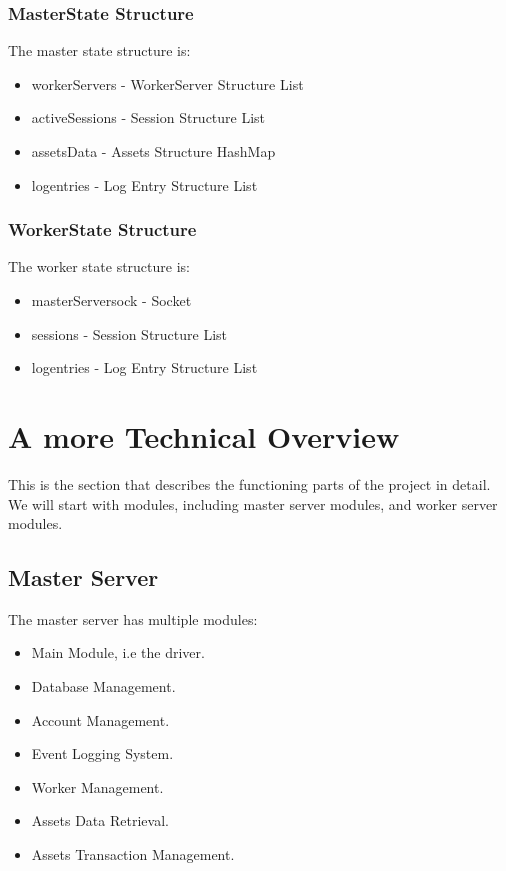 \documentclass[a4paper]{article}
\begin{document}
\subsubsection{MasterState Structure}
\label{ds_masterstate}
The master state structure is:
\begin{itemize}
	\item workerServers - WorkerServer Structure List
	\item activeSessions - Session Structure List
	\item assetsData - Assets Structure HashMap
	\item logentries - Log Entry Structure List
\end{itemize}

\subsubsection{WorkerState Structure}
\label{ds_workerstate}
The worker state structure is:
\begin{itemize}
	\item masterServersock - Socket
	\item sessions - Session Structure List
	\item logentries - Log Entry Structure List
\end{itemize}

\section{A more Technical Overview}
\label{technical_overview}
This is the section that describes the functioning parts of the project in
detail. We will start with modules, including master server modules, and worker
server modules.

\subsection{Master Server}
\label{technical_master_server}
The master server has multiple modules:
\begin{itemize}
	\item Main Module, i.e the driver.
	\item Database Management.
	\item Account Management.
	\item Event Logging System.
	\item Worker Management.
	\item Assets Data Retrieval.
	\item Assets Transaction Management.
\end{itemize}
\end{document}

